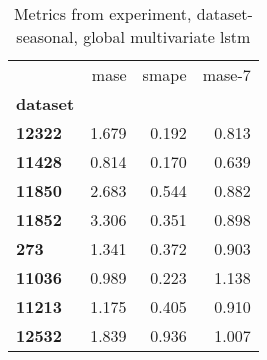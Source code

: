 \begin{table}[h]
\centering
\caption{Metrics from experiment, dataset-seasonal, global multivariate lstm}
\label{table:global-multivariate-lstm-dataset-seasonal}
\begin{tabular}{lrrr}
\toprule
{} &   mase &  smape &  mase-7 \\
\textbf{dataset} &        &        &         \\
\midrule
\textbf{12322  } &  1.679 &  0.192 &   0.813 \\
\textbf{11428  } &  0.814 &  0.170 &   0.639 \\
\textbf{11850  } &  2.683 &  0.544 &   0.882 \\
\textbf{11852  } &  3.306 &  0.351 &   0.898 \\
\textbf{273    } &  1.341 &  0.372 &   0.903 \\
\textbf{11036  } &  0.989 &  0.223 &   1.138 \\
\textbf{11213  } &  1.175 &  0.405 &   0.910 \\
\textbf{12532  } &  1.839 &  0.936 &   1.007 \\
\bottomrule
\end{tabular}
\end{table}
